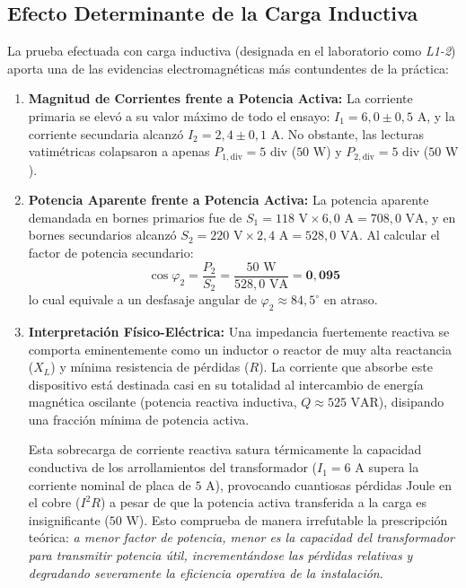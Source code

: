 \subsection{Efecto Determinante de la Carga Inductiva}

La prueba efectuada con carga inductiva (designada en el laboratorio como \textit{L1-2}) aporta una de las evidencias electromagnéticas más contundentes de la práctica:
\begin{enumerate}
    \item \textbf{Magnitud de Corrientes frente a Potencia Activa:}
    La corriente primaria se elevó a su valor máximo de todo el ensayo: $I_1 = 6{,}0 \pm 0{,}5\text{ A}$, y la corriente secundaria alcanzó $I_2 = 2{,}4 \pm 0{,}1\text{ A}$. No obstante, las lecturas vatimétricas colapsaron a apenas $P_{1,\text{div}} = 5\text{ div}$ ($50\text{ W}$) y $P_{2,\text{div}} = 5\text{ div}$ ($50\text{ W}$).
    \item \textbf{Potencia Aparente frente a Potencia Activa:}
    La potencia aparente demandada en bornes primarios fue de $S_1 = 118\text{ V} \times 6{,}0\text{ A} = 708{,}0\text{ VA}$, y en bornes secundarios alcanzó $S_2 = 220\text{ V} \times 2{,}4\text{ A} = 528{,}0\text{ VA}$. Al calcular el factor de potencia secundario:
    \begin{equation}
        \cos\varphi_2 = \frac{P_2}{S_2} = \frac{50\text{ W}}{528{,}0\text{ VA}} = \mathbf{0{,}095}
    \end{equation}
    lo cual equivale a un desfasaje angular de $\varphi_2 \approx 84{,}5^{\circ}$ en atraso.
    \item \textbf{Interpretación Físico-Eléctrica:}
    Una impedancia fuertemente reactiva se comporta eminentemente como un inductor o reactor de muy alta reactancia ($X_L$) y mínima resistencia de pérdidas ($R$). La corriente que absorbe este dispositivo está destinada casi en su totalidad al intercambio de energía magnética oscilante (potencia reactiva inductiva, $Q \approx 525\text{ VAR}$), disipando una fracción mínima de potencia activa.
    
    Esta sobrecarga de corriente reactiva satura térmicamente la capacidad conductiva de los arrollamientos del transformador ($I_1 = 6\text{ A}$ supera la corriente nominal de placa de $5\text{ A}$), provocando cuantiosas pérdidas Joule en el cobre ($I^2 R$) a pesar de que la potencia activa transferida a la carga es insignificante ($50\text{ W}$). Esto comprueba de manera irrefutable la prescripción teórica: \textit{a menor factor de potencia, menor es la capacidad del transformador para transmitir potencia útil, incrementándose las pérdidas relativas y degradando severamente la eficiencia operativa de la instalación}.
\end{enumerate}

